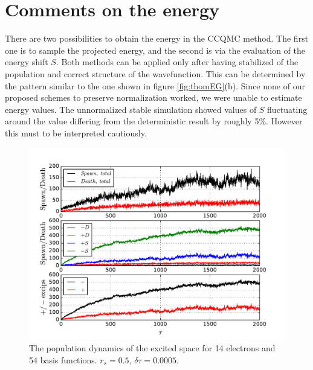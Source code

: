 \documentclass[twoside,english]{uiofysmaster}
\begin{document}
\section{Comments on the energy}
There are two possibilities to obtain the energy in the CCQMC
method. The first one is to sample the projected energy, and the second is
via the evaluation of the energy shift $S$. Both methods can be applied
only after having stabilized of the population and correct structure of the
wavefunction. This can be determined by the pattern similar to the one
shown in figure \ref{fig:thomEG}(b). Since none of our proposed
schemes to preserve normalization worked, we were unable to estimate
energy values. The unnormalized stable simulation showed values of $S$
fluctuating around the value differing from the deterministic result
by roughly 5\%. However this must to be interpreted cautiously.



\begin{landscape}
	
	\begin{figure}[ht!]
		\centering
		\includegraphics[width=0.8\linewidth]{platFind}
		\caption{The population dynamics of the excited space for 14 electrons and 54 basis functions. $r_s=0.5$, $\delta \tau=0.0005$.}
		\label{fig:platFind}
	\end{figure}
	
\end{landscape}
\end{document}
